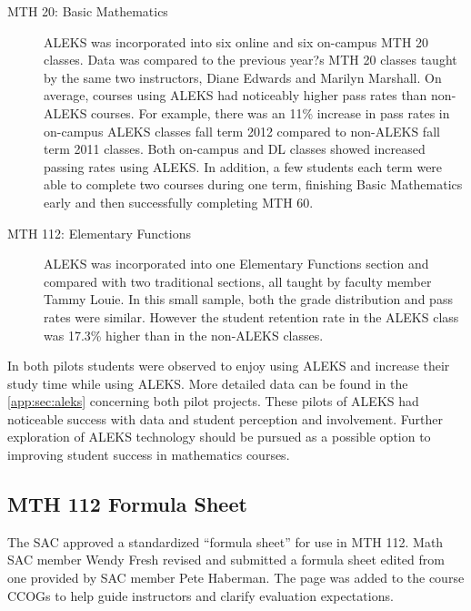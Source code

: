 \begin{description}
\item[MTH 20: Basic Mathematics] ALEKS was incorporated into six online and six on-campus MTH 20 classes.  Data was compared to the previous year?s MTH 20 classes taught by the same two instructors, Diane Edwards and Marilyn Marshall.  On average, courses using ALEKS had noticeably higher pass rates than non-ALEKS courses.  For example, there was an 11\% increase in pass rates in on-campus ALEKS classes fall term 2012 compared to non-ALEKS fall term 2011 classes.  Both on-campus and DL classes showed increased passing rates using ALEKS.  In addition, a few students each term were able to complete two courses during one term, finishing Basic Mathematics early and then successfully completing MTH 60.

\item[MTH 112: Elementary Functions] ALEKS was incorporated into one Elementary Functions section and compared with two traditional sections, all taught by faculty member Tammy Louie.  In this small sample, both the grade distribution and pass rates were similar.  However the student retention rate in the ALEKS class was 17.3\% higher than in the non-ALEKS classes.  
 
 \end{description}
 
In both pilots students were observed to enjoy using ALEKS and increase their study time while using ALEKS.  More detailed data can be found in the \vref{app:sec:aleks} concerning both pilot projects. These pilots of ALEKS had noticeable success with data and student perception and involvement.  Further exploration of ALEKS technology should be pursued as a possible option to improving student success in mathematics courses.
 
\subsection{MTH 112 Formula Sheet}
The SAC approved a standardized ``formula sheet'' for use in MTH 112.  Math SAC member Wendy Fresh revised and submitted a formula sheet edited from one provided by SAC member Pete Haberman.  The page was added to the course CCOGs to help guide instructors and clarify evaluation expectations.
 
